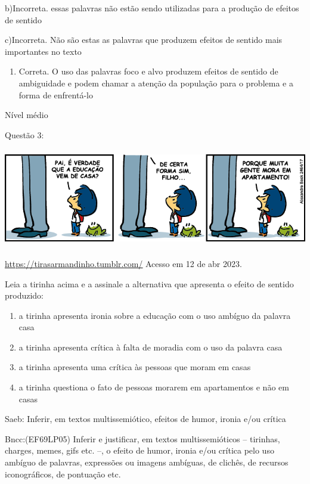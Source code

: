b)Incorreta. essas palavras não estão sendo utilizadas para a produção
de efeitos de sentido

c)Incorreta. Não são estas as palavras que produzem efeitos de sentido
mais importantes no texto

\begin{enumerate}
\def\labelenumi{\arabic{enumi}.}
\tightlist
\item
  Correta. O uso das palavras foco e alvo produzem efeitos de sentido de
  ambiguidade e podem chamar a atenção da população para o problema e a
  forma de enfrentá-lo
\end{enumerate}

Nível médio

Questão 3:

\includegraphics[width=5.90551in,height=1.70833in]{./imgSAEB_7_POR/media/image7.png}

\href{https://tirasarmandinho.tumblr.com/}{\uline{https://tirasarmandinho.tumblr.com/}}
Acesso em 12 de abr 2023.

Leia a tirinha acima e a assinale a alternativa que apresenta o efeito
de sentido produzido:

\begin{enumerate}
\def\labelenumi{\alph{enumi})}
\item
  a tirinha apresenta ironia sobre a educação com o uso ambíguo da
  palavra casa
\item
  a tirinha apresenta crítica à falta de moradia com o uso da palavra
  casa
\item
  a tirinha apresenta uma crítica às pessoas que moram em casas
\item
  a tirinha questiona o fato de pessoas morarem em apartamentos e não em
  casas
\end{enumerate}

Saeb: Inferir, em textos multissemiótico, efeitos de humor, ironia e/ou
crítica

Bncc:(EF69LP05) Inferir e justificar, em textos multissemióticos --
tirinhas, charges, memes, gifs etc. --, o efeito de humor, ironia e/ou
crítica pelo uso ambíguo de palavras, expressões ou imagens ambíguas, de
clichês, de recursos iconográficos, de pontuação etc.

